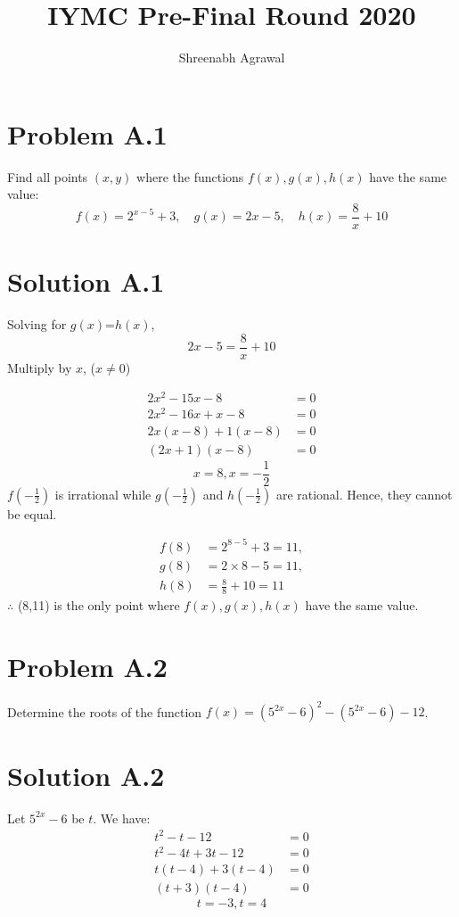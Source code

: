 \documentclass{article}
\author{Shreenabh Agrawal}
\title{IYMC Pre-Final Round 2020}
\begin{document}
\maketitle
\newpage

\section*{Problem A.1}
Find all points $(x, y)$ where the functions $f(x), g(x), h(x)$ have the same value:
$$
f(x)=2^{x-5}+3, \quad g(x)=2 x-5, \quad h(x)=\frac{8}{x}+10
$$
\section*{Solution A.1}
Solving for $g(x)$=$h(x)$,
$$2x-5=\frac{8}{x}+10$$
Multiply by $x$, ($x\neq0$)

\begin{align*}
2x^2-15x-8&=0 \\
2x^2-16x+x-8&=0 \\
2x(x-8)+1(x-8)&=0\\
(2x+1)(x-8)&=0
\end{align*}
$$\boxed{x=8, x=-\frac{1}{2}}$$
$f\left(-\frac{1}{2}\right)$ is irrational while $g\left(-\frac{1}{2}\right)$ and $h\left(-\frac{1}{2}\right)$ are rational. Hence, they cannot be equal.

\begin{align*}
    f(8)&=2^{8-5}+3=11, \\
    g(8)&=2\times8-5=11, \\
    h(8)&=\frac{8}{8}+10=11
\end{align*}
$\therefore$ (8,11) is the only point where $f(x), g(x), h(x)$ have the same value.

\newpage
\section*{Problem A.2}
Determine the roots of the function $f(x)=\left(5^{2 x}-6\right)^{2}-\left(5^{2 x}-6\right)-12$.
\section*{Solution A.2}
Let $5^{2x}-6$ be $t$. We have:
\begin{align*}
    t^2-t-12&=0 \\
    t^2-4t+3t-12&=0 \\
    t(t-4)+3(t-4)&=0 \\
    (t+3)(t-4)&=0
\end{align*}
$$\boxed{t=-3, t=4}$$
\end{document}
